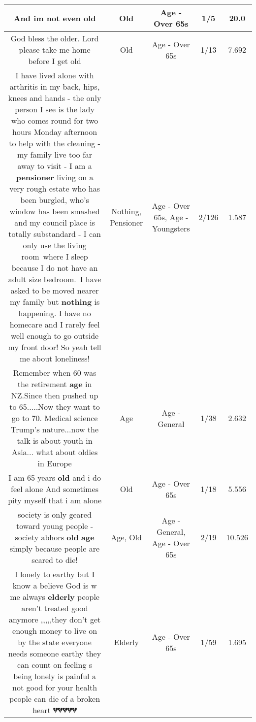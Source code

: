 \documentclass[11pt]{article}
\newlength\mylength
\begin{document}
\begin{center}
\begin{longtable}{|C{.65\mylength}|C{.30\mylength}|C{.12\mylength}|C{.12\mylength}|C{.12\mylength}|}
  \small And im not even old\normalsize   & Old & Age - Over 65s & 1/5 & 20.0 \\  \hline
  \small God bless the older. Lord please take me home before I get old\normalsize   & Old & Age - Over 65s & 1/13 & 7.692 \\  \hline
  \small I have lived alone with arthritis in my back, hips, knees and hands - the only person I see is the lady who comes round for two hours Monday afternoon to help with the cleaning - my family live too far away to visit - I am a \textbf{pensioner} living on a very rough estate who has been burgled, who's window has been smashed and my council place is totally substandard - I can only use the living room where I sleep because I do not have an adult size bedroom. I have asked to be moved nearer my family but \textbf{nothing} is happening. I have no homecare and I rarely feel well enough to go outside my front door! So yeah tell me about loneliness!\normalsize   & Nothing, Pensioner & Age - Over 65s, Age - Youngsters & 2/126 & 1.587 \\  \hline
  \small Remember when 60 was the retirement \textbf{age} in NZ.Since then pushed up to 65.....Now they want to go to 70. Medical science Trump's nature...now the talk is about youth in Asia... what about oldies in Europe\normalsize   & Age & Age - General & 1/38 & 2.632 \\  \hline
  \small I am 65 years \textbf{old} and i do feel  alone   And sometimes pity myself that i am alone\normalsize   & Old & Age - Over 65s & 1/18 & 5.556 \\  \hline
  \small society is only geared toward young people - society abhors \textbf{old} \textbf{age} simply because people are scared to die!\normalsize   & Age, Old & Age - General, Age - Over 65s & 2/19 & 10.526 \\  \hline
  \small I lonely to earthy but I know a believe God is w me always    \textbf{elderly} people aren't treated good anymore ,,,,,they don't get enough money to live on by the state everyone needs someone earthy they can count on feeling s being lonely is painful a not good for your health people can die of a broken heart 💔💔💔💔💔\normalsize   & Elderly & Age - Over 65s & 1/59 & 1.695 \\  \hline

\end{longtable}
\end{center}
\end{document}
